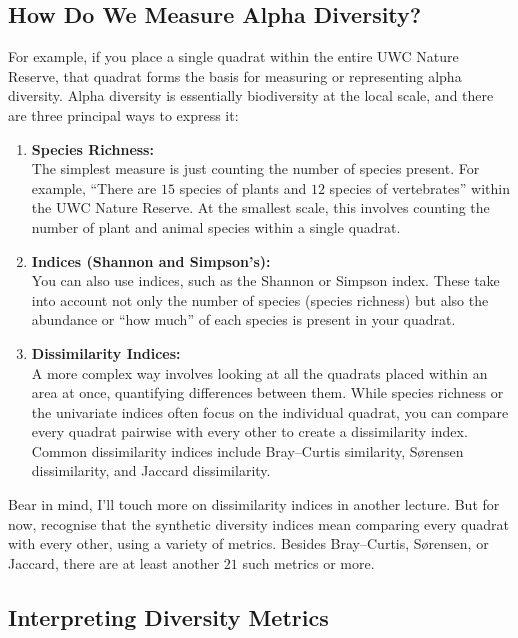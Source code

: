 \documentclass[
  10pt,
]{book}
\begin{document}
\subsection{How Do We Measure Alpha
Diversity?}\label{how-do-we-measure-alpha-diversity}

For example, if you place a single quadrat within the entire UWC Nature
Reserve, that quadrat forms the basis for measuring or representing
alpha diversity. Alpha diversity is essentially biodiversity at the
local scale, and there are three principal ways to express it:

\begin{enumerate}
\def\labelenumi{\arabic{enumi}.}
\item
  \textbf{Species Richness:}\\
  The simplest measure is just counting the number of species present.
  For example, ``There are \(15\) species of plants and \(12\) species
  of vertebrates'' within the UWC Nature Reserve. At the smallest scale,
  this involves counting the number of plant and animal species within a
  single quadrat.
\item
  \textbf{Indices (Shannon and Simpson's):}\\
  You can also use indices, such as the Shannon or Simpson index. These
  take into account not only the number of species (species richness)
  but also the abundance or ``how much'' of each species is present in
  your quadrat.
\item
  \textbf{Dissimilarity Indices:}\\
  A more complex way involves looking at all the quadrats placed within
  an area at once, quantifying differences between them. While species
  richness or the univariate indices often focus on the individual
  quadrat, you can compare every quadrat pairwise with every other to
  create a dissimilarity index. Common dissimilarity indices include
  Bray--Curtis similarity, Sørensen dissimilarity, and Jaccard
  dissimilarity.
\end{enumerate}

Bear in mind, I'll touch more on dissimilarity indices in another
lecture. But for now, recognise that the synthetic diversity indices
mean comparing every quadrat with every other, using a variety of
metrics. Besides Bray--Curtis, Sørensen, or Jaccard, there are at least
another \(21\) such metrics or more.

\subsection{Interpreting Diversity
Metrics}\label{interpreting-diversity-metrics}
\end{document}
